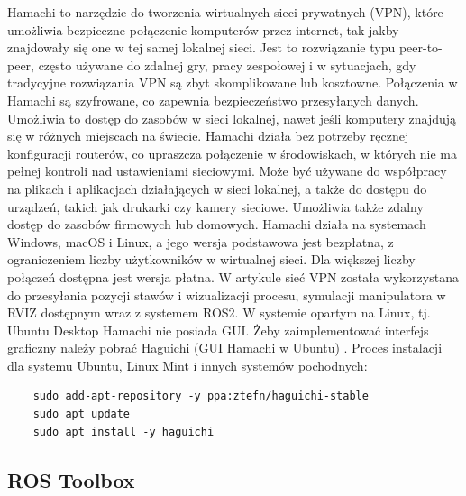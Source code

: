 \documentclass[journal,twoside,web]{ieeecolor}
\begin{document}
Hamachi to narzędzie do tworzenia wirtualnych sieci prywatnych (VPN), które umożliwia bezpieczne połączenie komputerów przez internet, tak jakby znajdowały się one w tej samej lokalnej sieci. Jest to rozwiązanie typu peer-to-peer, często używane do zdalnej gry, pracy zespołowej i w sytuacjach, gdy tradycyjne rozwiązania VPN są zbyt skomplikowane lub kosztowne. Połączenia w Hamachi są szyfrowane, co zapewnia bezpieczeństwo przesyłanych danych. Umożliwia to dostęp do zasobów w sieci lokalnej, nawet jeśli komputery znajdują się w różnych miejscach na świecie. Hamachi działa bez potrzeby ręcznej konfiguracji routerów, co upraszcza połączenie w środowiskach, w których nie ma pełnej kontroli nad ustawieniami sieciowymi. Może być używane do współpracy na plikach i aplikacjach działających w sieci lokalnej, a także do dostępu do urządzeń, takich jak drukarki czy kamery sieciowe. Umożliwia także zdalny dostęp do zasobów firmowych lub domowych. Hamachi działa na systemach Windows, macOS i Linux, a jego wersja podstawowa jest bezpłatna, z ograniczeniem liczby użytkowników w wirtualnej sieci. Dla większej liczby połączeń dostępna jest wersja płatna. W artykule sieć VPN została wykorzystana do przesyłania pozycji stawów i wizualizacji procesu, symulacji manipulatora w RVIZ dostępnym wraz z systemem ROS2. W systemie opartym na Linux, tj. Ubuntu Desktop Hamachi nie posiada GUI. Żeby zaimplementować interfejs graficzny należy pobrać Haguichi (GUI Hamachi w Ubuntu) \href{https://haguichi.net/download/}{\cite{Haguichi}}.
Proces instalacji dla systemu Ubuntu, Linux Mint i innych systemów pochodnych:

\begin{footnotesize}
\begin{verbatim}
	sudo add-apt-repository -y ppa:ztefn/haguichi-stable
	sudo apt update
	sudo apt install -y haguichi
\end{verbatim}
\end{footnotesize}
\subsection{ROS Toolbox}
\end{document}
